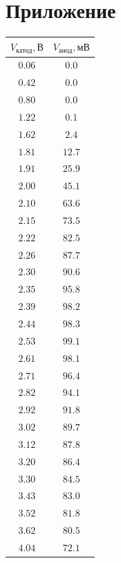 \documentclass[a4paper, 12pt]{article}
\begin{document}
    \section{Приложение}

\begin{table}[!ht]
    \centering
    \begin{tabular}{|c|c|}
        \hline

        $V_{катод}, В$ & $V_{анод}, мВ$\\ \hline
        $0.06$ & $0.0$\\ \hline
        $0.42$ & $0.0$\\ \hline
        $0.80$ & $0.0$\\ \hline
        $1.22$ & $0.1$\\ \hline
        $1.62$ & $2.4$\\ \hline
        $1.81$ & $12.7$\\ \hline
        $1.91$ & $25.9$\\ \hline
        $2.00$ & $45.1$\\ \hline
        $2.10$ & $63.6$\\ \hline
        $2.15$ & $73.5$\\ \hline
        $2.22$ & $82.5$\\ \hline
        $2.26$ & $87.7$\\ \hline
        $2.30$ & $90.6$\\ \hline
        $2.35$ & $95.8$\\ \hline
        $2.39$ & $98.2$\\ \hline
        $2.44$ & $98.3$\\ \hline
        $2.53$ & $99.1$\\ \hline
        $2.61$ & $98.1$\\ \hline
        $2.71$ & $96.4$\\ \hline
        $2.82$ & $94.1$\\ \hline
        $2.92$ & $91.8$\\ \hline
        $3.02$ & $89.7$\\ \hline
        $3.12$ & $87.8$\\ \hline
        $3.20$ & $86.4$\\ \hline
        $3.30$ & $84.5$\\ \hline
        $3.43$ & $83.0$\\ \hline
        $3.52$ & $81.8$\\ \hline
        $3.62$ & $80.5$\\ \hline
        $4.04$ & $72.1$\\ \hline

\end{tabular}
\end{table}
\end{document}
